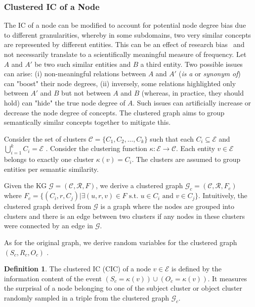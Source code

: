 \documentclass{article}
\theoremstyle{definition}
\newtheorem{definition}{Definition}
\newcommand{\G}{\mathcal{G}}
\begin{document}
\subsubsection{Clustered IC of a Node}
The IC of a node can be modified to account for potential node degree bias due to different granularities, whereby in some subdomains, two very similar concepts are represented by different entities. This can be an effect of research bias~\cite{reynolds2021accelerating} and not necessarily translate to a scientifically meaningful measure of frequency.
Let $A$ and $A'$ be two such similar entities and $B$ a third entity. 
Two possible issues can arise: (i) non-meaningful relations between $A$ and $A'$ (\emph{is a} or \emph{synonym of}) can "boost" their node degrees, (ii) inversely, some relations highlighted only between $A'$ and $B$ but not between $A$ and $B$ (whereas, in practice, they should hold) can "hide" the true node degree of $A$. 
Such issues can artificially increase or decrease the node degree of concepts.
The clustered graph aims to group semantically similar concepts together to mitigate this.

Consider the set of clusters $\mathcal{C} = \{C_{1}, C_{2}, \dots, C_{k}\}$ such that each $C_{i} \subseteq \mathcal{E}$ and $\bigcup_{i=1}^k C_i=\mathcal{E}$ . Consider the clustering function $\kappa: \mathcal{E} \rightarrow \mathcal{C}$. Each entity $v \in \mathcal{E}$ belongs to exactly one cluster $\kappa(v) = C_i$. The clusters are assumed to group entities per semantic similarity.

Given the KG $\G=(\mathcal{C}, \mathcal{R}, F)$, we derive a clustered graph $\G_c=(\mathcal{C}, \mathcal{R}, F_c)$ where $F_{c}= \{(C_{i},r,C_{j}) | \exists (u,r,v) \in F \text{ s.t. } u \in C_{i} \text{ and } v \in C_j \}$. Intuitively, the clustered graph derived from $\G$ is a graph where the nodes are grouped into clusters and there is an edge between two clusters if any nodes in these clusters were connected by an edge in $\G$.

As for the original graph, we derive random variables for the clustered graph $(S_{c}, R_{c}, O_{c})$ .
\begin{definition}
    The clustered IC (CIC) of a node $v \in \mathcal{E}$ is defined by the information content of the event $(S_{c}= \kappa(v)) \cup (O_{c} = \kappa(v))$. It measures the surprisal of a node belonging to one of the subject cluster or object cluster randomly sampled in a triple from the clustered graph $\G_c$.  
\end{definition}
\end{document}
